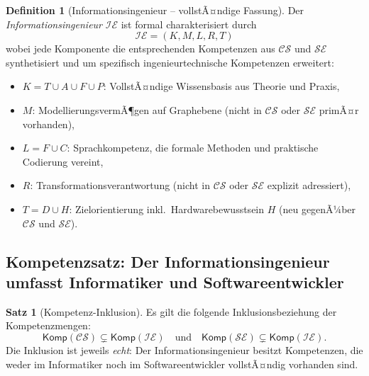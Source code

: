 ﻿\documentclass[a4paper,12pt]{article}
\theoremstyle{definition}
\newtheorem{definition}{Definition}
\newtheorem{satz}{Satz}
\begin{document}
\begin{definition}[Informationsingenieur -- vollstÃ¤ndige Fassung]
\label{def:infeng2}
Der \emph{Informationsingenieur} $\mathcal{IE}$ ist formal charakterisiert durch
\[
  \mathcal{IE} = (K, M, L, R, T)
\]
wobei jede Komponente die entsprechenden Kompetenzen aus $\mathcal{CS}$ und
$\mathcal{SE}$ synthetisiert und um spezifisch ingenieurtechnische Kompetenzen erweitert:
\begin{itemize}
  \item $K = T \cup A \cup F \cup P$: VollstÃ¤ndige Wissensbasis aus Theorie und Praxis,
  \item $M$: ModellierungsvermÃ¶gen auf Graphebene (nicht in $\mathcal{CS}$ oder $\mathcal{SE}$
        primÃ¤r vorhanden),
  \item $L = F \cup C$: Sprachkompetenz, die formale Methoden und praktische Codierung vereint,
  \item $R$: Transformationsverantwortung (nicht in $\mathcal{CS}$ oder $\mathcal{SE}$
        explizit adressiert),
  \item $T = D \cup H$: Zielorientierung inkl.\ Hardwarebewusstsein $H$ (neu gegenÃ¼ber $\mathcal{CS}$
        und $\mathcal{SE}$).
\end{itemize}
\end{definition}

\subsection{Kompetenzsatz: Der Informationsingenieur umfasst Informatiker und Softwareentwickler}

\begin{satz}[Kompetenz-Inklusion]
\label{satz:inklusion}
Es gilt die folgende Inklusionsbeziehung der Kompetenzmengen:
\[
  \mathsf{Komp}(\mathcal{CS}) \subsetneq \mathsf{Komp}(\mathcal{IE})
  \quad \text{und} \quad
  \mathsf{Komp}(\mathcal{SE}) \subsetneq \mathsf{Komp}(\mathcal{IE}).
\]
Die Inklusion ist jeweils \emph{echt}: Der Informationsingenieur besitzt Kompetenzen,
die weder im Informatiker noch im Softwareentwickler vollstÃ¤ndig vorhanden sind.
\end{satz}
\end{document}
